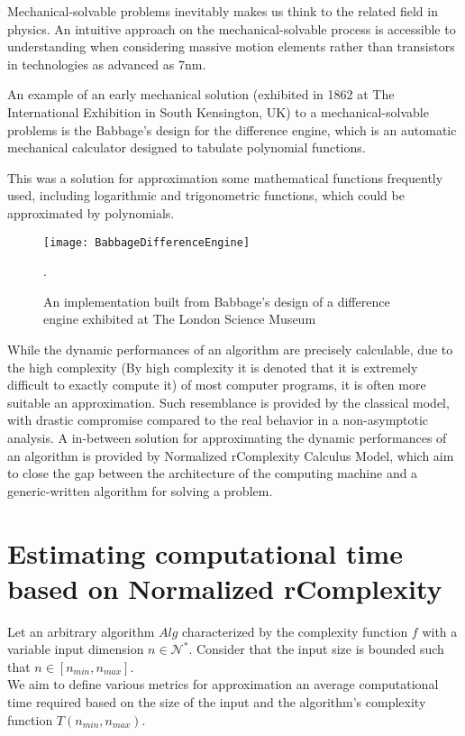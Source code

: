 \begin{remark}
    Mechanical-solvable problems inevitably makes us think to the related field in physics. An intuitive approach on the mechanical-solvable process is accessible
    to understanding when considering massive motion elements rather than transistors in technologies as advanced as 7nm.

    An example of an early mechanical solution (exhibited in 1862 at The International Exhibition in South Kensington, UK) to a mechanical-solvable problems is the Babbage's design for the difference engine, which is an automatic mechanical calculator designed to tabulate polynomial functions.

    This was a solution for approximation some mathematical functions frequently used, including logarithmic and trigonometric functions, which could be approximated by polynomials.

    \begin{figure}[H]
        \centering
        \texttt{[image: BabbageDifferenceEngine]}
        \caption{An implementation built from Babbage's design of a difference engine exhibited at The London Science Museum}.
    \end{figure}

\end{remark}

While the dynamic performances of an algorithm are precisely calculable, due to the high complexity (By high complexity it is denoted that it is extremely difficult to exactly compute it) of most computer programs, it is often more suitable an approximation. Such resemblance is provided by the classical model, with drastic compromise compared to the real behavior in a non-asymptotic analysis. A in-between solution for approximating the dynamic performances of an algorithm is provided by Normalized rComplexity Calculus Model, which aim to close the gap between the architecture of the computing machine and a generic-written algorithm for solving a problem.


\section{Estimating computational time based on Normalized rComplexity}
Let an arbitrary algorithm $Alg$ characterized by the complexity function $f$ with a variable input dimension $n \in \mathcal{N}^{*}$. Consider that the input size is bounded such that $n \in [n_{min}, n_{max}]$. \\
We aim to define various metrics for approximation an average computational time required based on the size of the input and the algorithm's complexity function  $T(n_{min}, n_{max})$.\\

